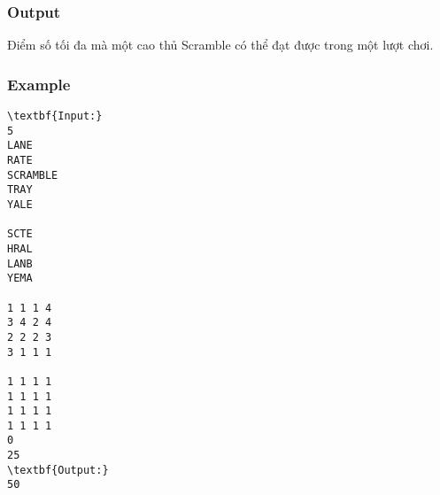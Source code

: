 \subsubsection{Output}

Điểm số tối đa mà một cao thủ Scramble có thể đạt được trong một lượt chơi.

\subsubsection{Example}
\begin{verbatim}
\textbf{Input:}
5
LANE
RATE
SCRAMBLE
TRAY
YALE

SCTE
HRAL
LANB
YEMA

1 1 1 4
3 4 2 4
2 2 2 3
3 1 1 1

1 1 1 1
1 1 1 1
1 1 1 1
1 1 1 1
0
25
\textbf{Output:}
50
\end{verbatim}
